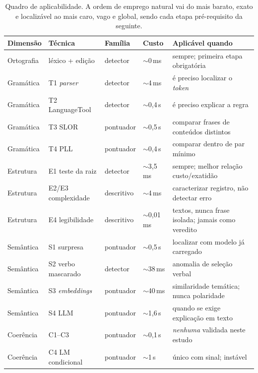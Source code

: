 \documentclass[11pt,a4paper]{article}
\newcommand{\dimtable}[1]{\small #1}
\begin{document}
\begin{table}[H]
\centering
\dimtable{
\begin{tabular}{@{}llllp{4.3cm}@{}}
\toprule
\textbf{Dimensão} & \textbf{Técnica} & \textbf{Família} & \textbf{Custo} & \textbf{Aplicável quando} \\
\midrule
Ortografia & léxico + edição      & detector  & $\sim$0\,ms   & sempre; primeira etapa obrigatória \\
Gramática  & T1 \textit{parser}   & detector  & $\sim$4\,ms   & é preciso localizar o \textit{token} \\
Gramática  & T2 LanguageTool      & detector  & $\sim$0,4\,s  & é preciso explicar a regra \\
Gramática  & T3 SLOR              & pontuador & $\sim$0,5\,s  & comparar frases de conteúdos distintos \\
Gramática  & T4 PLL               & pontuador & $\sim$0,4\,s  & comparar dentro de par mínimo \\
Estrutura  & E1 teste da raiz     & detector  & $\sim$3,5\,ms & sempre; melhor relação custo/exatidão \\
Estrutura  & E2/E3 complexidade   & descritivo& $\sim$4\,ms   & caracterizar registro, não detectar erro \\
Estrutura  & E4 legibilidade      & descritivo& $\sim$0,01\,ms& textos, nunca frase isolada; jamais como veredito \\
Semântica  & S1 surpresa          & pontuador & $\sim$0,5\,s  & localizar com modelo já carregado \\
Semântica  & S2 verbo mascarado   & detector  & $\sim$38\,ms  & anomalia de seleção verbal \\
Semântica  & S3 \textit{embeddings}& pontuador& $\sim$40\,ms  & similaridade temática; nunca polaridade \\
Semântica  & S4 LLM               & pontuador & $\sim$1,6\,s  & quando se exige explicação em texto \\
Coerência  & C1--C3               & pontuador & $\sim$0,1\,s  & \emph{nenhuma} validada neste estudo \\
Coerência  & C4 LM condicional    & pontuador & $\sim$1\,s    & único com sinal; instável \\
\bottomrule
\end{tabular}}
\caption{Quadro de aplicabilidade. A ordem de emprego natural vai do mais barato, exato e
localizável ao mais caro, vago e global, sendo cada etapa pré-requisito da seguinte.}
\label{tab:quadro}
\end{table}
\end{document}
